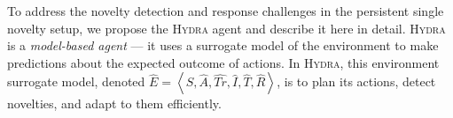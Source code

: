 \documentclass[sigconf]{aamas}
\newcommand{\tuple}[1]{\ensuremath{\left \langle #1 \right \rangle }}
\newcommand{\sbirds}{Science Birds\xspace} %
\newcommand{\hydra}{\textsc{Hydra}\xspace} %
\begin{document}





To address the novelty detection and response challenges in the persistent single novelty setup, we propose the \hydra agent and describe it here in detail.
\hydra is a \emph{model-based agent} --- it uses a surrogate model of the environment to make predictions about the expected outcome of actions. 
In \hydra, this environment surrogate model, denoted 
$\hat{E}=\tuple{\hat{S}, \hat{A}, \hat{Tr}, \hat{I}, \hat{T}, \hat{R}}$, is to plan its actions, detect novelties, and adapt to them efficiently. 
\end{document}
